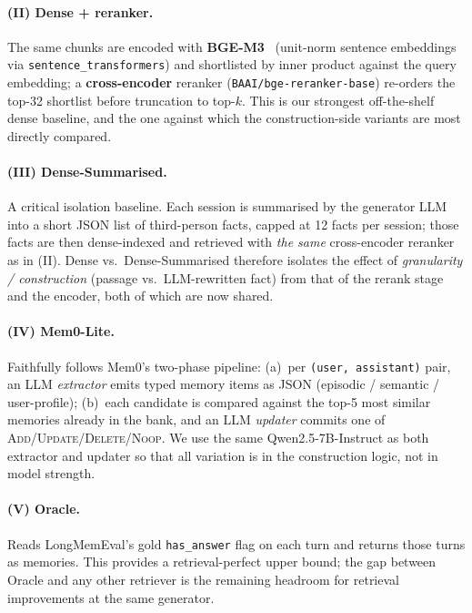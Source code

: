 \documentclass[11pt]{article}
\begin{document}
\paragraph{(II) Dense + reranker.}
The same chunks are encoded with \textbf{BGE-M3}~\citep{chen2024bgem3}
(unit-norm sentence embeddings via \texttt{sentence\_transformers})
and shortlisted by inner product against the query embedding; a
\textbf{cross-encoder} reranker (\texttt{BAAI/bge-reranker-base})
re-orders the top-32 shortlist before truncation to top-$k$. This is
our strongest off-the-shelf dense baseline, and the one against which
the construction-side variants are most directly compared.

\paragraph{(III) Dense-Summarised.}
A critical isolation baseline. Each session is summarised by the
generator LLM into a short JSON list of third-person facts, capped
at 12 facts per session; those facts are then dense-indexed and
retrieved with \emph{the same} cross-encoder reranker as in (II).
Dense vs.\ Dense-Summarised therefore isolates the effect of
\emph{granularity / construction} (passage vs.\ LLM-rewritten fact)
from that of the rerank stage and the encoder, both of which are now
shared.

\paragraph{(IV) Mem0-Lite.}
Faithfully follows Mem0's two-phase pipeline: (a)~per
\texttt{(user, assistant)} pair, an LLM \emph{extractor} emits typed
memory items as JSON (episodic / semantic / user-profile); (b)~each
candidate is compared against the top-5 most similar memories
already in the bank, and an LLM \emph{updater} commits one of
\textsc{Add}/\textsc{Update}/\textsc{Delete}/\textsc{Noop}. We use
the same Qwen2.5-7B-Instruct as both extractor and updater so that
all variation is in the construction logic, not in model strength.

\paragraph{(V) Oracle.}
Reads LongMemEval's gold \texttt{has\_answer} flag on each turn and
returns those turns as memories. This provides a retrieval-perfect
upper bound; the gap between Oracle and any other retriever is the
remaining headroom for retrieval improvements at the same generator.
\end{document}
